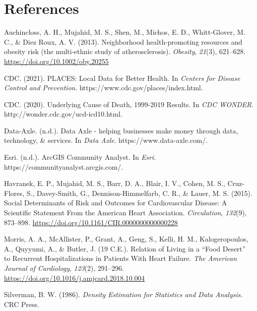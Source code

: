 \documentclass[]{elsarticle} %
\newlength{\cslhangindent}
\newenvironment{CSLReferences}[2] %
 {%
  \setlength{\parindent}{0pt}
  \ifodd #1 \everypar{\setlength{\hangindent}{\cslhangindent}}\ignorespaces\fi
  \ifnum #2 > 0
  \setlength{\parskip}{#2\baselineskip}
  \fi
 }%
 {}
\begin{document}
\hypertarget{references}{%
\section*{References}\label{references}}

\hypertarget{refs}{}
\begin{CSLReferences}{1}{0}
\leavevmode{}%
Auchincloss, A. H., Mujahid, M. S., Shen, M., Michos, E. D.,
Whitt-Glover, M. C., \& Diez Roux, A. V. (2013). Neighborhood
health-promoting resources and obesity risk (the multi-ethnic study of
atherosclerosis). \emph{Obesity}, \emph{21}(3), 621--628.
\url{https://doi.org/10.1002/oby.20255}

\leavevmode{}%
CDC. (2021). {PLACES}: {Local Data} for {Better Health}. In
\emph{Centers for Disease Control and Prevention}.
https://www.cdc.gov/places/index.html.

\leavevmode{}%
CDC. (2020). Underlying {Cause} of {Death}, 1999-2019 {Results}. In
\emph{CDC WONDER}. http://wonder.cdc.gov/ucd-icd10.html.

\leavevmode{}%
Data-Axle. (n.d.). Data {Axle} - helping businesses make money through
data, technology, \& services. In \emph{Data Axle}.
https://www.data-axle.com/.

\leavevmode{}%
Esri. (n.d.). {ArcGIS Community Analyst}. In \emph{Esri}.
https://communityanalyst.arcgis.com/.

\leavevmode{}%
Havranek, E. P., Mujahid, M. S., Barr, D. A., Blair, I. V., Cohen, M.
S., Cruz-Flores, S., Davey-Smith, G., Dennison-Himmelfarb, C. R., \&
Lauer, M. S. (2015). Social {Determinants} of {Risk} and {Outcomes} for
{Cardiovascular Disease}: {A Scientific Statement From} the {American
Heart Association}. \emph{Circulation}, \emph{132}(9), 873--898.
\url{https://doi.org/10.1161/CIR.0000000000000228}

\leavevmode{}%
Morris, A. A., McAllister, P., Grant, A., Geng, S., Kelli, H. M.,
Kalogeropoulos, A., Quyyumi, A., \& Butler, J. (19 C.E.). Relation of
{Living} in a {``{Food Desert}''} to {Recurrent Hospitalizations} in
{Patients With Heart Failure}. \emph{The American Journal of
Cardiology}, \emph{123}(2), 291--296.
\url{https://doi.org/10.1016/j.amjcard.2018.10.004}

\leavevmode{}%
Silverman, B. W. (1986). \emph{Density {Estimation} for {Statistics} and
{Data Analysis}}. {CRC Press}.

\end{CSLReferences}
\end{document}
